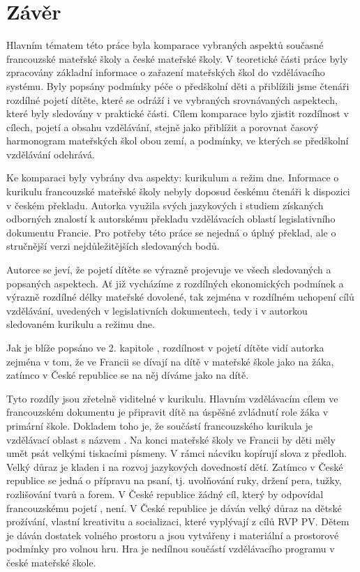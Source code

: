 \chapter*{Závěr}
Hlavním tématem této práce byla komparace vybraných aspektů současné francouzské mateřské školy a české mateřské školy. V teoretické části práce byly zpracovány základní informace o zařazení mateřských škol do vzdělávacího systému. Byly popsány podmínky péče o předškolní děti a přiblížili jsme čtenáři rozdílné pojetí dítěte, které se odráží i ve vybraných srovnávaných aspektech, které byly sledovány v praktické části. Cílem komparace bylo zjistit rozdílnost v cílech, pojetí a obsahu vzdělávání, stejně jako přiblížit a porovnat časový harmonogram mateřských škol obou zemí, a podmínky, ve kterých se předškolní vzdělávání odehrává.  

Ke komparaci byly vybrány dva aspekty: kurikulum a režim dne. Informace o kurikulu francouzské mateřské školy nebyly doposud českému čtenáři k dispozici v českém překladu. Autorka využila svých jazykových i studiem získaných odborných znalostí k autorskému překladu vzdělávacích oblastí legislativního dokumentu Francie. Pro potřeby této práce se nejedná o úplný překlad, ale o stručnější verzi nejdůležitějších sledovaných bodů. 

Autorce se jeví, že pojetí dítěte se výrazně projevuje ve všech sledovaných a popsaných aspektech. Ať již vycházíme z rozdílných ekonomických podmínek a výrazně rozdílné délky mateřské dovolené, tak zejména v rozdílném uchopení cílů vzdělávání, uvedených v legislativních dokumentech, tedy i v autorkou sledovaném kurikulu a režimu dne. 

Jak je blíže popsáno ve 2. kapitole , rozdílnost v pojetí dítěte vidí autorka zejména v tom, že ve Francii se dívají na dítě v mateřské škole jako na žáka, zatímco v České republice se na něj díváme jako na dítě.   

Tyto rozdíly jsou zřetelně viditelné v kurikulu. Hlavním vzdělávacím cílem ve francouzském dokumentu je připravit dítě na úspěšné zvládnutí role žáka v primární škole. Dokladem toho je, že součástí francouzského kurikula je vzdělávací oblast s názvem . Na konci mateřské školy ve Francii by děti měly umět psát velkými tiskacími písmeny. V rámci nácviku kopírují slova z předloh. Velký důraz je kladen i na rozvoj jazykových dovedností dětí. Zatímco v České republice se jedná o přípravu na psaní, tj. uvolňování ruky, držení pera, tužky, rozlišování tvarů a forem. V České republice žádný cíl, který by odpovídal francouzskému pojetí , není. V České republice je dáván velký důraz na dětské prožívání, vlastní kreativitu a socializaci, které vyplývají z cílů RVP PV. Dětem je dáván dostatek volného prostoru a jsou vytvářeny i materiální a prostorové podmínky pro volnou hru. Hra je nedílnou součástí vzdělávacího programu v české mateřské škole. 

